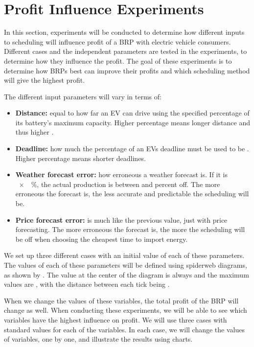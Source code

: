 \section{Profit Influence Experiments}\label{sec:profitexp}
In this section, experiments will be conducted to determine how different inputs to scheduling will influence profit of a BRP with electric vehicle consumers. Different cases and the independent parameters are tested in the experiments, to determine how they influence the profit. The goal of these experiments is to determine how BRPs best can improve their profits and which scheduling method will give the highest profit.

The different input parameters will vary in terms of:

\begin{itemize}
	\item \textbf{Distance:} equal to how far an EV can drive using the specified percentage of its battery's maximum capacity. Higher percentage means longer distance and thus higher .
	\item \textbf{Deadline:} how much the percentage of an EVs deadline must be used to be . Higher percentage means shorter deadlines.
	\item \textbf{Weather forecast error:} how erroneous a weather forecast is. If it is \SI[parse-numbers = false]{x}{\percent}, the actual production is between  and  percent off. The more erroneous the forecast is, the less accurate and predictable the scheduling will be. 
	\item \textbf{Price forecast error:} is much like the previous value, just with price forecasting. The more erroneous the forecast is, the more the scheduling will be off when choosing the cheapest time to import energy. 
\end{itemize} 

We set up three different cases with an initial value of each of these parameters. The values of each of these parameters will be defined using spiderweb diagrams, as shown by . The value at the center of the diagram is always  and the maximum values are , with the distance between each tick being .


When we change the values of these variables, the total profit of the BRP will change as well. When conducting these experiments, we will be able to see which variables have the highest influence on profit. We will use three cases with standard values for each of the variables. In each case, we will change the values of variables, one by one, and illustrate the results using charts.

